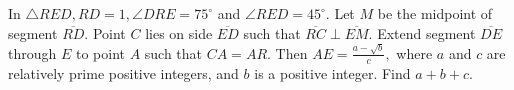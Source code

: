 In $\triangle RED, RD =1, \angle DRE = 75^\circ$ and $\angle RED = 45^\circ$. Let $M$ be the midpoint of segment $\overline{RD}$. Point $C$ lies on side $\overline{ED}$ such that $\overline{RC} \perp \overline{EM}$. Extend segment $\overline{DE}$ through $E$ to point $A$ such that $CA = AR$. Then $AE = \tfrac{a-\sqrt{b}}{c},$ where $a$ and $c$ are relatively prime positive integers, and $b$ is a positive integer. Find $a+b+c$.